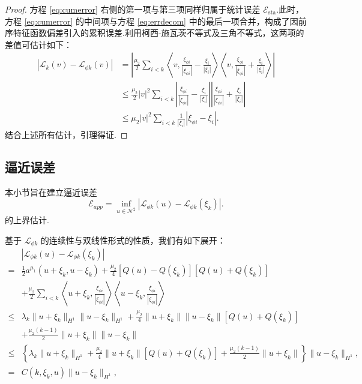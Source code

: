 \begin{proof}
方程 \eqref{eq:cumerror} 右侧的第一项与第三项同样归属于统计误差 $\mathcal{E}_{\text{sta}}$.此时，方程 \eqref{eq:cumerror} 的中间项与方程 \eqref{eq:errdecom} 中的最后一项合并，构成了因前序特征函数偏差引入的累积误差.利用柯西-施瓦茨不等式及三角不等式，这两项的差值可估计如下：
\begin{equation*}
\begin{aligned}
\left|\mathcal{L}_{k}(v)-\mathcal{L}_{\phi k}(v)\right| &= \left| \frac{\mu_2}{2}\sum\limits_{i<k}\left\langle v, \frac{\xi_{\phi i}}{\left|\xi_{\phi i}\right|}-\frac{\xi_{i}}{\left|\xi_{i}\right|}\right\rangle\left\langle v, \frac{\xi_{\phi i}}{\left|\xi_{\phi i}\right|}+\frac{\xi_{i}}{\left|\xi_{i}\right|}\right\rangle \right| \\
& \leq \frac{\mu_{2}}{2}|v|^{2}\sum\limits_{i<k}\left|\frac{\xi_{\phi i}}{\left|\xi_{\phi i}\right|}-\frac{\xi_{i}}{\left|\xi_{i}\right|}\right| \left|\frac{\xi_{\phi i}}{\left|\xi_{\phi i}\right|}+\frac{\xi_{i}}{\left|\xi_{i}\right|}\right| \\
& \leq \mu_2|v|^2\sum\limits_{i<k}\frac{1}{|\xi_i|}|\xi_{\phi i}-\xi_{i}|.
\end{aligned}
\end{equation*}
结合上述所有估计，引理得证.
\end{proof}


\subsection{逼近误差}\label{subsec_app}
本小节旨在建立逼近误差
\begin{equation*}
\mathcal{E}_{app}=\inf_{u \in \mathcal{N}^{2}}\left|\mathcal{L}_{\phi k}(u)-\mathcal{L}_{\phi k}(\xi_{k})\right|.
\end{equation*}
的上界估计.

基于 $\mathcal{L}_{\phi k}$ 的连续性与双线性形式的性质，我们有如下展开：
\begin{equation*}
\begin{aligned}
&\left|\mathcal{L}_{\phi k}(u)-\mathcal{L}_{\phi k}(\xi_{k})\right|\\
=& \frac{1}{2}a^{\mu_{1}}(u+\xi_{k},u-\xi_{k})+\frac{\mu_{2}}{4}\left[Q(u)-Q(\xi_{k})\right]\left[Q(u)+Q(\xi_{k})\right]\\
&+\frac{\mu_{2}}{2}\sum\limits_{i<k}\left\langle u+\xi_{k},\frac{\xi_{\phi i}}{|\xi_{\phi i}|} \right\rangle \left\langle u-\xi_{k},\frac{\xi_{\phi i}}{|\xi_{\phi i}|} \right\rangle \\
\leq& \lambda_{k}\|u+\xi_{k}\|_{H^{1}}\|u-\xi_{k}\|_{H^{1}}+\frac{\mu_{2}}{4}\|u+\xi_{k}\|\|u-\xi_{k}\|\left[Q(u)+Q(\xi_{k})\right]\\
&+\frac{\mu_{2}(k-1)}{2}\|u+\xi_{k}\|\|u-\xi_{k}\| \\
\leq&\left\{\lambda_{k}\|u+\xi_{k}\|_{H^{1}}+\frac{\mu_{2}}{4}\|u+\xi_{k}\|\left[Q(u)+Q(\xi_{k})\right]+\frac{\mu_{2}(k-1)}{2}\|u+\xi_{k}\|\right\} \|u-\xi_{k}\|_{H^{1}},\\
=& C(k, \xi_k, u) \|u-\xi_{k}\|_{H^{1}},
\end{aligned}
\end{equation*}

